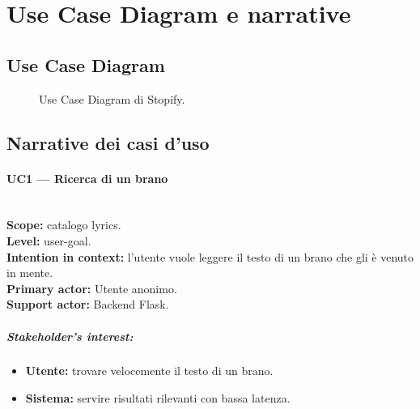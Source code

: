 \section{Use Case Diagram e narrative}

\subsection{Use Case Diagram}
\begin{figure}[H]
    \centering
    \caption{Use Case Diagram di Stopify.}
    \label{fig:usecase}
\end{figure}

\subsection{Narrative dei casi d'uso}

\paragraph{UC1 --- Ricerca di un brano}\hfill\\
\textbf{Scope:} catalogo lyrics.\\
\textbf{Level:} user-goal.\\
\textbf{Intention in context:} l'utente vuole leggere il testo di un brano
che gli è venuto in mente.\\
\textbf{Primary actor:} Utente anonimo.\\
\textbf{Support actor:} Backend Flask.

\subparagraph{Stakeholder's interest:}
\begin{itemize}
    \item \textbf{Utente:} trovare velocemente il testo di un brano.
    \item \textbf{Sistema:} servire risultati rilevanti con bassa latenza.
\end{itemize}


